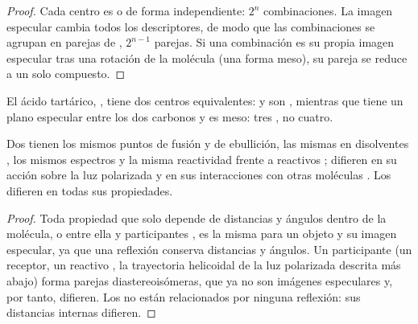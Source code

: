 \begin{proof}
Cada centro es  o  de forma independiente: $2^n$
combinaciones. La imagen especular cambia todos los descriptores, de modo
que las combinaciones se agrupan en parejas de , $2^{n-1}$
parejas. Si una combinación es su propia imagen especular tras una
rotación de la molécula (una forma meso), su pareja se reduce a un solo
compuesto.
\end{proof}

El ácido tartárico, , tiene dos centros
equivalentes:  y  son , mientras que
 tiene un plano especular entre los dos carbonos y es meso: tres
, no cuatro.

\begin{proposition}\label{prop:b1:stereochemistry-in-depth:enantiomer-properties}
Dos  tienen los mismos puntos de fusión y de ebullición, las
mismas  en disolventes , los mismos espectros y la
misma reactividad frente a reactivos ; difieren en su acción
sobre la luz polarizada y en sus interacciones con otras moléculas
. Los  difieren en todas sus propiedades.
\end{proposition}

\begin{proof}
Toda propiedad que solo depende de distancias y ángulos dentro de la
molécula, o entre ella y participantes , es la misma para un
objeto y su imagen especular, ya que una reflexión conserva distancias y
ángulos. Un participante  (un receptor, un reactivo , la
trayectoria helicoidal de la luz polarizada descrita más abajo) forma
parejas diastereoisómeras, que ya no son imágenes especulares y, por
tanto, difieren. Los  no están relacionados por ninguna
reflexión: sus distancias internas difieren.
\end{proof}

